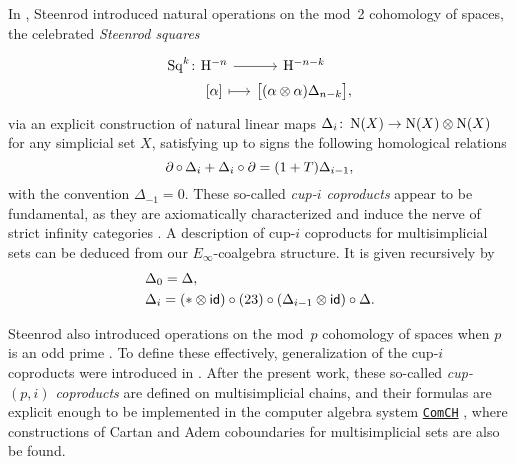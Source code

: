 In \cite{steenrod1947products}, Steenrod introduced natural operations on the mod~2 cohomology of spaces, the celebrated \textit{Steenrod squares}
\[
\begin{tikzcd} [column sep=small, row sep=0]
	\Sq^k \colon &[-20] \rH^{-n} \arrow[r] & \rH^{-n-k} \\ &
	{[\alpha]} \arrow[r, mapsto] & \big[ (\alpha \ot \alpha) \Delta_{n-k} \big],
\end{tikzcd}
\]
via an explicit construction of natural linear maps $\Delta_i \colon \operatorname{N}(X) \to \operatorname{N}(X) \otimes \operatorname{N}(X)$ for any simplicial set $X$, satisfying up to signs the following homological relations
\[
\operatorname{\partial} \circ \, \Delta_i + \Delta_i \circ \operatorname{\partial} = (1 + T) \Delta_{i-1},
\]
with the convention $\Delta_{-1} = 0$.
These so-called \textit{cup-$i$ coproducts} appear to be fundamental, as they are axiomatically characterized \cite{medina2022axiomatic} and induce the nerve of strict infinity categories \cite{medina2020globular}.
A description of cup-$i$ coproducts for multisimplicial sets can be deduced from our $E_\infty$-coalgebra structure.
It is given recursively by
\[
\begin{split}
	& \Delta_0 = \Delta, \\
	& \Delta_i =
	(\ast \otimes \mathsf{id}) \circ (23) \circ (\Delta_{i-1} \otimes \mathsf{id}) \circ \Delta.
\end{split}
\]

Steenrod also introduced operations on the mod~$p$ cohomology of spaces when $p$ is an odd prime \cite{steenrod1952reduced, steenrod1953cyclic}.
To define these effectively, generalization of the cup-$i$ coproducts were introduced in \cite{medina2021may_st}.
After the present work, these so-called \textit{cup-$(p,i)$ coproducts} are defined on multisimplicial chains, and their formulas are explicit enough to be implemented in the computer algebra system \href{https://comch.readthedocs.io/en/latest/}{\texttt{ComCH}} \cite{medina2021comch}, where constructions of Cartan and Adem coboundaries \cite{medina2020cartan,medina2021adem,medina2023oddcartan} for multisimplicial sets are also be found.